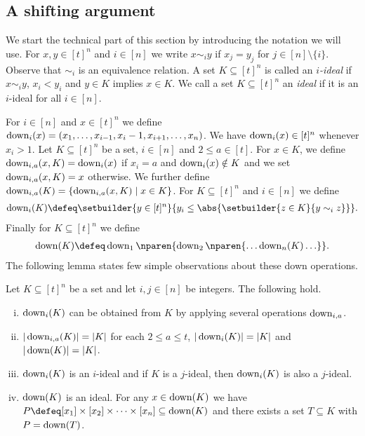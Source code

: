 \subsection{A shifting argument}
\label{sec:ham:isoperimetry:comp}
We start the technical part of this section by introducing the
notation we will use. For $x,y\in[t]^n$ and $i\in[n]$ we write
$x\sim_iy$ if $x_j=y_j$ for $j\in[n]\setminus\{i\}$. Observe
that $\sim_i$ is an equivalence relation. A set $K\subseteq
[t]^n$ is called an {\em $i$-ideal} if $x\sim_i y$, $x_i<y_i$
and $y\in K$ implies $x\in K$. We call a set $K\subseteq[t]^n$
an {\em ideal} if it is an $i$-ideal for all $i\in[n]$.

For $i\in[n]$ and $x\in[t]^n$ we define
$\operatorname{down}_{i}(x)=(x_1,\ldots,x_{i-1},x_i-1,x_{i+1},\ldots,x_n)$. 
We have $\operatorname{down}_i(x)\in[t]^n$ whenever $x_i>1$.
%
Let $K\subseteq [t]^n$ be a set, $i\in[n]$ and $2\le a\in[t]$. 
For $x\in K$, we define $\operatorname{down}_{i,a}(x,K)=\operatorname{down}_i(x)$ if 
$x_i=a$ and $\operatorname{down}_i(x)\notin K$ and we set 
$\operatorname{down}_{i,a}(x,K)=x$ otherwise. We further define
$\operatorname{down}_{i,a}(K)=\{\operatorname{down}_{i,a}(x,K)\mid x\in K\}$.
For $K\subseteq[t]^n$ and $i\in[n]$ we define
\begin{align*}
\down_i(K)\defeq\setbuilder{y\in[t]^n}{y_i\le\abs{\setbuilder{z\in K}{y\sim_iz}}}.
\end{align*}
Finally for $K\subseteq[t]^n$ we define
\begin{align*}
\down(K)\defeq\down_1\nparen{\down_2\nparen{\ldots\down_n(K)\ldots}}.
\end{align*}
The following lemma states few simple observations about these
down operations.
\begin{lemma}
\label{lem:down}
Let $K\subseteq[t]^n$ be a set and let $i,j\in[n]$ be integers. 
The following hold.
\begin{enumerate}[(i)]
\item $\operatorname{down}_i(K)$ can be obtained from $K$ by applying several
  operations $\operatorname{down}_{i,a}$.
\item $|\operatorname{down}_{i,a}(K)|=|K|$ for each $2\le a\le t$, 
$|\operatorname{down}_i(K)|=|K|$ and $|\operatorname{down}(K)|=|K|$.
\item $\operatorname{down}_i(K)$ is an $i$-ideal and
if $K$ is a $j$-ideal, then $\operatorname{down}_i(K)$ is also a $j$-ideal.
\item $\operatorname{down}(K)$ is an ideal. For any $x\in\operatorname{down}(K)$ we have 
$P\defeq[x_1]\times[x_2]\times\cdots\times[x_n]
\subseteq\down(K)$ and there exists a set $T\subseteq K$ with
$P= \operatorname{down}(T)$.
\end{enumerate}
\end{lemma}
